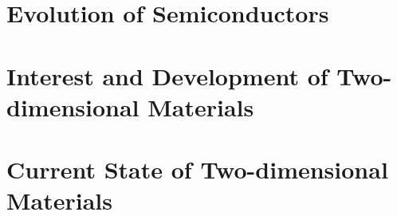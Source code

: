 \section{Evolution of Semiconductors}\label{sec:semicond_evolution}

\section{Interest and Development of Two-dimensional Materials}\label{sec:2D_development}

\section{Current State of Two-dimensional Materials}\label{sec:current_state}